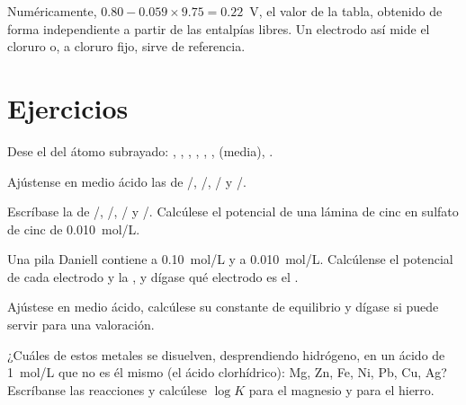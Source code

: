 Numéricamente, $0.80 - 0.059 \times 9.75 = 0.22$~V, el valor de la tabla,
obtenido de forma independiente a partir de las entalpías libres. Un
electrodo así mide el cloruro o, a cloruro fijo, sirve de referencia.

\section{Ejercicios}

\begin{exercise}[$\star$]\label{exo:b1:nernst:1}
Dese el  del átomo subrayado: ,
, , ,
, , 
(media), .
\end{exercise}

\begin{exercise}[$\star$]\label{exo:b1:nernst:2}
Ajústense en medio ácido las  de /,
/, / y /.
\end{exercise}

\begin{exercise}[$\star$]\label{exo:b1:nernst:3}
Escríbase la  de /, /,
/ y /. Calcúlese el potencial de una
lámina de cinc en sulfato de cinc de \qty{0.010}{mol/L}.
\end{exercise}

\begin{exercise}[$\star$]\label{exo:b1:nernst:4}
Una pila Daniell contiene  a \qty{0.10}{mol/L} y  a
\qty{0.010}{mol/L}. Calcúlense el potencial de cada electrodo y la , y dígase qué electrodo es el .
\end{exercise}

\begin{exercise}[$\star\star$]\label{exo:b1:nernst:5}
Ajústese  en medio ácido, calcúlese su constante de
equilibrio y dígase si puede servir para una valoración.
\end{exercise}

\begin{exercise}[$\star\star$]\label{exo:b1:nernst:6}
¿Cuáles de estos metales se disuelven, desprendiendo hidrógeno, en un
ácido de \qty{1}{mol/L} que no es él mismo  (el ácido
clorhídrico): Mg, Zn, Fe, Ni, Pb, Cu, Ag? Escríbanse las reacciones y
calcúlese $\log K$ para el magnesio y para el hierro.
\end{exercise}

